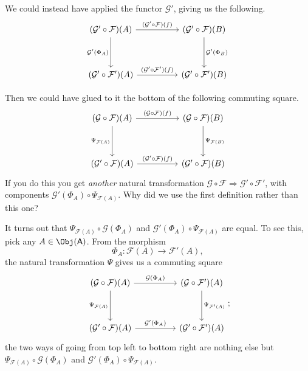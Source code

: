 \documentclass[notes.tex]{subfiles}
\begin{document}
We could instead have applied the functor $\mathcal{G}'$, giving us the following.
\begin{equation*}
  \begin{tikzcd}[row sep=huge, column sep=huge]
    (\mathcal{G}' \circ \mathcal{F})(A)
    \arrow[d, swap, "\mathcal{G}'(\Phi_{A})"]
    \arrow[r, "(\mathcal{G}' \circ \mathcal{F})(f)"]
    & (\mathcal{G}' \circ \mathcal{F})(B)
    \arrow[d, "\mathcal{G}'(\Phi_{B})"]
    \\
    (\mathcal{G}' \circ \mathcal{F}')(A)
    \arrow[r, "(\mathcal{G}' \circ \mathcal{F}')(f)"]
    & (\mathcal{G}' \circ \mathcal{F}')(B)
  \end{tikzcd}
\end{equation*}

Then we could have glued to it the bottom of the following commuting square.
\begin{equation*}
  \begin{tikzcd}[row sep=huge, column sep=huge]
    (\mathcal{G} \circ \mathcal{F})(A)
    \arrow[r, "(\mathcal{G} \circ \mathcal{F})(f)"]
    \arrow[d, swap, "\Psi_{\mathcal{F}(A)}"]
    & (\mathcal{G} \circ \mathcal{F})(B)
    \arrow[d, "\Psi_{\mathcal{F}(B)}"]
    \\
    (\mathcal{G}' \circ \mathcal{F})(A)
    \arrow[r, "(\mathcal{G}' \circ \mathcal{F})(f)"]
    & (\mathcal{G}' \circ \mathcal{F})(B)
  \end{tikzcd}
\end{equation*}
If you do this you get \emph{another} natural transformation $\mathcal{G} \circ \mathcal{F} \Rightarrow \mathcal{G}' \circ \mathcal{F}'$, with components $\mathcal{G}'(\Phi_{A}) \circ \Psi_{\mathcal{F}(A)}$. Why did we use the first definition rather than this one?

It turns out that $\Psi_{\mathcal{F}(A)} \circ \mathcal{G}(\Phi_{A})$ and $\mathcal{G}'(\Phi_{A}) \circ \Psi_{\mathcal{F}(A)}$ are equal. To see this, pick any $A \in \Obj(\mathsf{A})$. From the morphism
\begin{equation*}
  \Phi_{A}\colon \mathcal{F}(A) \to \mathcal{F}'(A),
\end{equation*}
the natural transformation $\Psi$ gives us a commuting square
\begin{equation*}
  \begin{tikzcd}[row sep=huge, column sep=huge]
    (\mathcal{G} \circ \mathcal{F})(A)
    \arrow[r, "\mathcal{G}(\Phi_{A})"]
    \arrow[d, swap, "\Psi_{\mathcal{F}(A)}"]
    & (\mathcal{G} \circ \mathcal{F}')(A)
    \arrow[d, "\Psi_{\mathcal{F}'(A)}"]
    \\
    (\mathcal{G}' \circ \mathcal{F})(A)
    \arrow[r, "\mathcal{G}'(\Phi_{A})"]
    & (\mathcal{G}' \circ \mathcal{F}')(A)
  \end{tikzcd};
\end{equation*}
the two ways of going from top left to bottom right are nothing else but $\Psi_{\mathcal{F}(A)} \circ \mathcal{G}(\Phi_{A})$ and $\mathcal{G}'(\Phi_{A}) \circ \Psi_{\mathcal{F}(A)}$.
\end{document}
